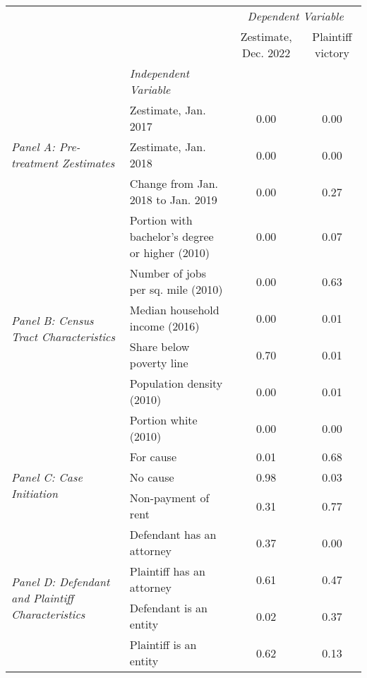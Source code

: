\begin{tabular}{llcc}
\toprule
 &  & \multicolumn{2}{c}{\textit{Dependent Variable}} \\
 &  & Zestimate, Dec. 2022 & Plaintiff victory \\
 & \emph{Independent Variable} &  &  \\
\midrule
\multirow[c]{3}{3cm}{\textit{Panel A: Pre-treatment Zestimates}} & Zestimate, Jan. 2017 & 0.00 & 0.00 \\
 & Zestimate, Jan. 2018 & 0.00 & 0.00 \\
 & Change from Jan. 2018 to Jan. 2019 & 0.00 & 0.27 \\
\cline{1-4}
\multirow[c]{6}{3cm}{\textit{Panel B: Census Tract Characteristics}} & Portion with bachelor's degree or higher (2010) & 0.00 & 0.07 \\
 & Number of jobs per sq. mile (2010) & 0.00 & 0.63 \\
 & Median household income (2016) & 0.00 & 0.01 \\
 & Share below poverty line & 0.70 & 0.01 \\
 & Population density (2010) & 0.00 & 0.01 \\
 & Portion white (2010) & 0.00 & 0.00 \\
\cline{1-4}
\multirow[c]{3}{3cm}{\textit{Panel C: Case Initiation}} & For cause & 0.01 & 0.68 \\
 & No cause & 0.98 & 0.03 \\
 & Non-payment of rent & 0.31 & 0.77 \\
\cline{1-4}
\multirow[c]{4}{3cm}{\textit{Panel D: Defendant and Plaintiff Characteristics}} & Defendant has an attorney & 0.37 & 0.00 \\
 & Plaintiff has an attorney & 0.61 & 0.47 \\
 & Defendant is an entity & 0.02 & 0.37 \\
 & Plaintiff is an entity & 0.62 & 0.13 \\
\cline{1-4}
\bottomrule
\end{tabular}
